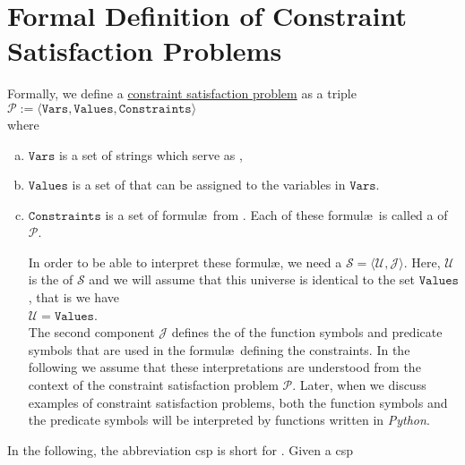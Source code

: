 \section[Formal Definition of \textsc{Csp}s]{Formal Definition of Constraint Satisfaction Problems}
Formally, we define a 
\href{https://en.wikipedia.org/wiki/Constraint_satisfaction_problem}{constraint satisfaction problem} as a triple
\\[0.2cm]
\hspace*{1.3cm}
$\mathcal{P} := \langle \mathtt{Vars}, \mathtt{Values}, \mathtt{Constraints} \rangle$
\\[0.2cm]
where 
\begin{enumerate}[(a)]
\item $\mathtt{Vars}$ is a set of strings which serve as ,
\item $\mathtt{Values}$ is a set of  that can be assigned to the variables in $\mathtt{Vars}$.
\item $\mathtt{Constraints}$ is a set of formul\ae\ from .  Each of these formul\ae\ is
      called a  of $\mathcal{P}$.

      In order to be able to interpret these formul\ae, we need a  $\mathcal{S} = \langle \mathcal{U}, \mathcal{J} \rangle$.  
      Here, $\mathcal{U}$ is the  of $\mathcal{S}$ and we will assume that this
      universe is identical to the set $\mathtt{Values}$, that is we have
      \\[0.2cm]
      \hspace*{1.3cm}
      $\mathcal{U} = \texttt{Values}$.
      \\[0.2cm]
      The second component $\mathcal{J}$ defines the
       of the function symbols and predicate symbols that are used in the formul\ae\
      defining the constraints.  In the following we assume that these interpretations are understood from the
      context of the constraint satisfaction problem $\mathcal{P}$.  Later, when we discuss examples of constraint
      satisfaction problems, both the function symbols and the predicate symbols will be interpreted
      by functions written in \textsl{Python}.
\end{enumerate}
In the following, the abbreviation \ac{csp} is short for .
Given a \ac{csp}
\\[0.2cm]
\hspace*{1.3cm}

